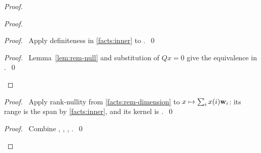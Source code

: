 \begin{proof}
\begin{proof}
\begin{proof}\pf\ Apply definiteness in \ref{facts:inner} to
.~\qed\end{proof}
\qedstep
\begin{proof}\pf\ Lemma~\ref{lem:rem-null} and substitution of $Qx=0$
give the equivalence in .~\qed\end{proof}
\end{proof}
\begin{proof}\pf\ Apply rank-nullity from \ref{facts:rem-dimension}
to $x\mapsto\sum_i x(i){\mathbf w}_i$: its range is the span by
\ref{facts:inner}, and its kernel is .~\qed\end{proof}
\qedstep
\begin{proof}\pf\ Combine , ,
, .~\qed\end{proof}
\end{proof}

